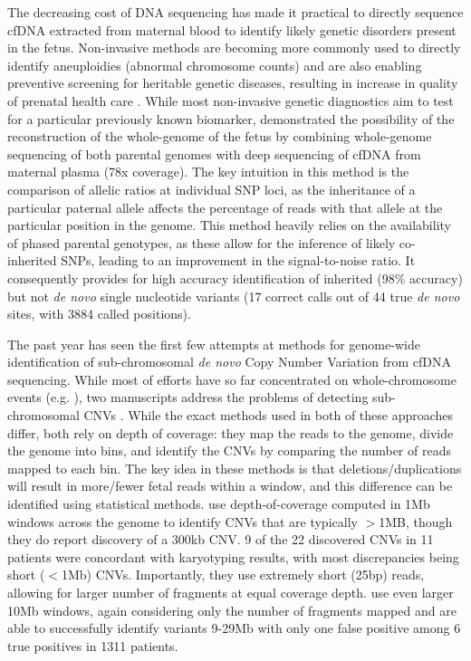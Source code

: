 The decreasing cost of DNA sequencing has made it practical to directly sequence cfDNA extracted from maternal blood to identify likely genetic disorders present in the fetus.  Non-invasive methods are becoming more commonly used to directly identify aneuploidies (abnormal chromosome counts) and are also enabling preventive screening for heritable genetic diseases, resulting in increase in quality of prenatal health care \citep{saunders2012}.  While most non-invasive genetic diagnostics aim to test for a particular previously known biomarker,  \cite{kitzman2012} demonstrated the possibility of the reconstruction of the whole-genome of the fetus by combining whole-genome sequencing of both parental genomes with deep sequencing of cfDNA from maternal plasma (78x coverage). The key intuition in this method is the comparison of allelic ratios at individual SNP loci, as the inheritance of a particular paternal allele affects the percentage of reads with that allele at the particular position in the genome.  This method heavily relies on the availability of phased parental genotypes, as these allow for the inference of likely co-inherited SNPs, leading to an improvement in the signal-to-noise ratio. It consequently provides for high accuracy identification of inherited (98\% accuracy) but not \emph{de novo} single nucleotide variants (17 correct calls out of 44 true \textit{de novo} sites, with 3884 called positions).

The past year has seen the first few attempts at methods for genome-wide identification of sub-chromosomal \emph{de novo}  Copy Number Variation from cfDNA sequencing. While most of efforts have so far concentrated on whole-chromosome events (e.g. \cite{chu2009}), two manuscripts address the problems of detecting sub-chromosomal CNVs \citep{chen2013, srinivasan2013}. While the exact methods used in both of these approaches differ, both rely on depth of coverage:  they map the reads to the genome, divide the genome into bins, and identify the CNVs by comparing the number of reads mapped to each bin. The key idea in these methods is that deletions/duplications will result in more/fewer fetal reads within a window, and this difference can be identified using statistical methods. \cite{srinivasan2013} use depth-of-coverage computed in 1Mb windows across the genome to identify CNVs that are typically $>$1MB, though they do report discovery of a 300kb CNV. 9 of the 22 discovered CNVs in 11 patients were concordant with karyotyping results, with most discrepancies being short ($<$1Mb) CNVs. Importantly, they use extremely short (25bp) reads, allowing for larger number of fragments at equal coverage depth. \cite{chen2013} use even larger 10Mb windows, again considering only the number of fragments mapped  and are able to successfully identify variants 9-29Mb with only one false positive among 6 true positives in 1311 patients.

